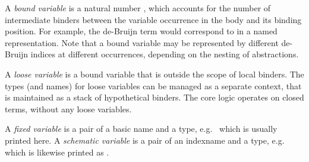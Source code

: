 \begin{isabellebody}
\begin{isamarkuptext}
  \medskip A \emph{bound variable} is a natural number ,
  which accounts for the number of intermediate binders between the
  variable occurrence in the body and its binding position.  For
  example, the de-Bruijn term  would
  correspond to  in a named
  representation.  Note that a bound variable may be represented by
  different de-Bruijn indices at different occurrences, depending on
  the nesting of abstractions.

  A \emph{loose variable} is a bound variable that is outside the
  scope of local binders.  The types (and names) for loose variables
  can be managed as a separate context, that is maintained as a stack
  of hypothetical binders.  The core logic operates on closed terms,
  without any loose variables.

  A \emph{fixed variable} is a pair of a basic name and a type, e.g.\
   which is usually printed  here.  A
  \emph{schematic variable} is a pair of an indexname and a type,
  e.g.\  which is likewise printed as .


\end{isamarkuptext}
\end{isabellebody}

